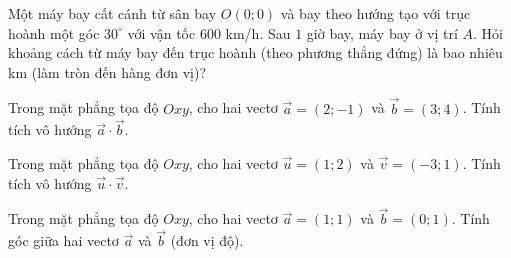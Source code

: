 \begin{bt}%
Một máy bay cất cánh từ sân bay $O(0;0)$ và bay theo hướng tạo với trục hoành một góc $30^\circ$ với vận tốc $600$ km/h. Sau $1$ giờ bay, máy bay ở vị trí $A$. Hỏi khoảng cách từ máy bay đến trục hoành (theo phương thẳng đứng) là bao nhiêu km (làm tròn đến hàng đơn vị)?
\end{bt}

\begin{bt}%
Trong mặt phẳng tọa độ $Oxy$, cho hai vectơ $\overrightarrow{a}=(2;-1)$ và $\overrightarrow{b}=(3;4)$. Tính tích vô hướng $\overrightarrow{a}\cdot\overrightarrow{b}$.
\end{bt}

\begin{bt}%
Trong mặt phẳng tọa độ $Oxy$, cho hai vectơ $\overrightarrow{u}=(1;2)$ và $\overrightarrow{v}=(-3;1)$. Tính tích vô hướng $\overrightarrow{u}\cdot\overrightarrow{v}$.
\end{bt}

\begin{bt}%
Trong mặt phẳng tọa độ $Oxy$, cho hai vectơ $\overrightarrow{a}=(1;1)$ và $\overrightarrow{b}=(0;1)$. Tính góc giữa hai vectơ $\overrightarrow{a}$ và $\overrightarrow{b}$ (đơn vị độ).
\end{bt}

